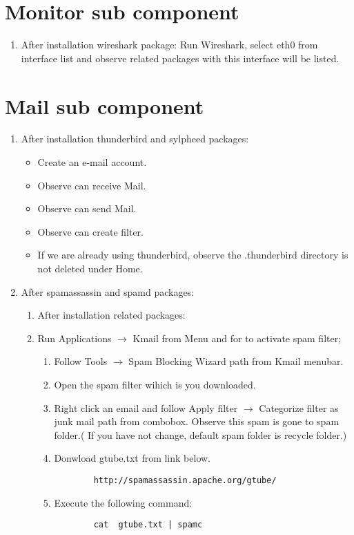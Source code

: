 \documentclass[a4paper,10pt]{article}
\begin{document}
\section{Monitor sub component}
\begin{enumerate}
 \item After installation wireshark package:
	Run Wireshark, select eth0 from interface list and observe related packages with this interface will be listed.
\end{enumerate}

\section{Mail sub component}
\begin{enumerate}
 \item After installation thunderbird and sylpheed packages:
\begin{itemize}
\item Create an e-mail account.
\item Observe can receive Mail.
\item Observe can send Mail.
\item Observe can create filter.
\item If we are already using thunderbird, observe the .thunderbird directory is not deleted under Home.
\end{itemize}
 \item After spamassassin and spamd packages:
\begin{enumerate}
	\item After installation related packages:
	\item Run Applications $\rightarrow$ Kmail from Menu and for to activate spam filter;
		
	\begin{enumerate}
		\item Follow Tools $\rightarrow$  Spam Blocking Wizard path from Kmail menubar.
		\item Open the spam filter wihich is you downloaded.
		\item Right click an email and follow Apply filter $\rightarrow$ Categorize filter as junk mail path from combobox.
		Observe this spam is gone to spam folder.( If you have not change, default spam folder is recycle folder.)

		\item Donwload gtube.txt from link below.
		\begin{verbatim}
 		http://spamassassin.apache.org/gtube/
		\end{verbatim}
		\item  Execute the following command:
		\begin{verbatim}
 		cat  gtube.txt | spamc 
		\end{verbatim}
		

\end{enumerate}
\end{enumerate}
\end{enumerate}
\end{document}
